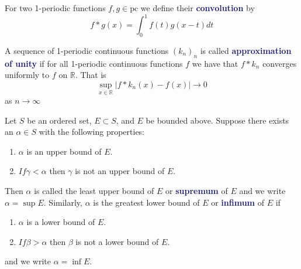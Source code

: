 \documentclass[11pt]{article}
\numberwithin{equation}{section}
\newcommand{\navy}[1]{\textcolor{MidnightBlue}{\bf #1}}
\theoremstyle{definition}
\theoremstyle{definition}
\newcommand\abs[1]{\left| #1 \right|}
\newcommand{\1}{\mathbbm 1}
\newcommand{\RR}{\mathbb R}
\begin{document}
\begin{definition}[Convolution]
For two 1-periodic functions $f,g \in \text{pc}$ we define their \navy{convolution} by
\begin{equation}
f * g(x) = \int_0^1 f(t)g(x-t)dt
\end{equation}
\end{definition}

\begin{definition}
A sequence of 1-periodic continuous functions $(k_n)_n$ is called \navy{approximation of unity} if for all 1-periodic continuous functions $f$ we have that $f * k_n$ converges uniformly to $f$ on $\RR$. That is
\begin{equation}
\sup_{x \in \RR} \abs{f * k_n(x) - f(x)} \to 0
\end{equation}
as $n \to \infty$
\end{definition}

\begin{definition}
Let $S$ be an ordered set, $E \subset S$, and $E$ be bounded above. Suppose there exists an $\alpha \in S$ with the following properties:
\begin{enumerate}
\item $\alpha$ is an upper bound of $E$.
\item $If \gamma < \alpha$ then $\gamma$ is not an upper bound of $E$.
\end{enumerate}
Then $\alpha$ is called the least upper bound of $E$ or \navy{supremum} of $E$ and we write $\alpha = \sup E$. Similarly, $\alpha$ is the greatest lower bound of $E$ or \navy{infimum} of $E$ if
\begin{enumerate}
\item $\alpha$ is a lower bound of $E$.
\item $If \beta > \alpha$ then $\beta$ is not a lower bound of $E$.
\end{enumerate}
and we write $\alpha = \inf E$.
\end{definition}
\end{document}
